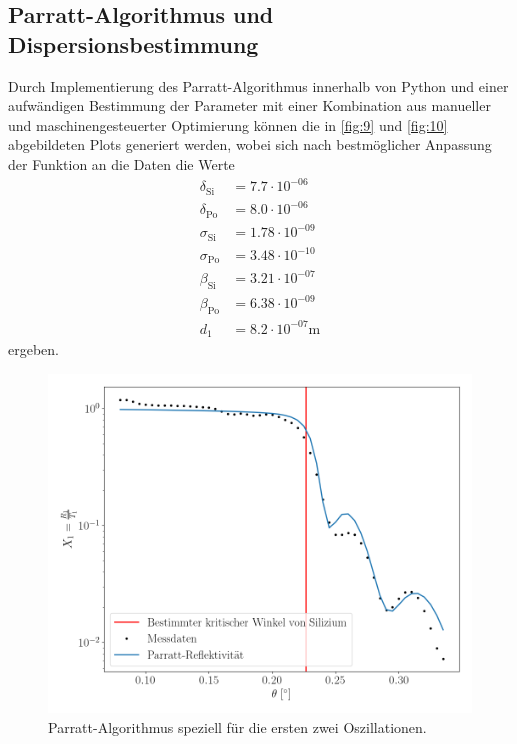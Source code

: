 \documentclass[12pt]{article}
\begin{document}
\subsection{Parratt-Algorithmus und Dispersionsbestimmung}
Durch Implementierung des Parratt-Algorithmus innerhalb von Python und einer aufwändigen Bestimmung der Parameter mit einer Kombination aus manueller und maschinengesteuerter Optimierung können die in \autoref{fig:9} und \autoref{fig:10} abgebildeten Plots generiert werden, wobei sich nach bestmöglicher Anpassung der Funktion an die Daten die Werte
\begin{align*}
  \delta_\text{Si}  &=\num{7.7}\cdot10^{-06}\\
  \delta_\text{Po}  &=\num{8.0}\cdot10^{-06}\\
  \sigma_\text{Si}  &=\num{1.78}\cdot10^{-09}\\
  \sigma_\text{Po}  &=\num{3.48}\cdot10^{-10}\\
  \beta_\text{Si}   &=\num{3.21}\cdot10^{-07}\\
  \beta_\text{Po}   &=\num{6.38}\cdot10^{-09}\\
  d_1               &=\num{8.2}\cdot10^{-07}\si{\meter}
\end{align*}
ergeben.
\begin{figure}[H]
  \centering
  \includegraphics[scale=0.5]{Ressourcen/parratt6.png}
  \caption{Parratt-Algorithmus speziell für die ersten zwei Oszillationen.}\label{fig:9}
\end{figure}
\end{document}
